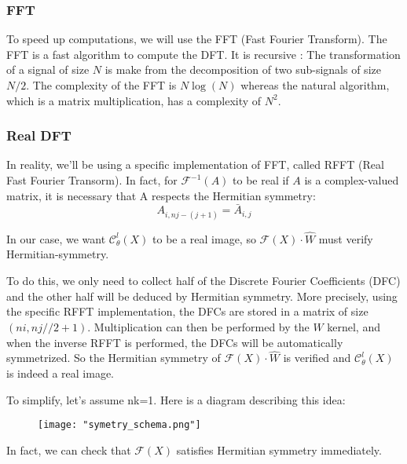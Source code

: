 \subsubsection{FFT}

To speed up computations, we will use the FFT (Fast Fourier Transform). The FFT is a fast algorithm to compute the DFT. It is recursive : The transformation of a signal of size $N$ is make from the decomposition of two sub-signals of size $N/2$. The complexity of the FFT is $N\log(N)$ whereas the natural algorithm, which is a matrix multiplication, has a complexity of $N^2$.

\subsubsection{Real DFT}

In reality, we'll be using a specific implementation of FFT, called RFFT (Real Fast Fourier Transorm). In fact, for $\mathcal{F}^{-1}(A)$ to be real if $A$ is a complex-valued matrix, it is necessary that A respects the Hermitian symmetry:
\begin{equation*}
	A_{i,nj-(j+1)} = \bar{A}_{i,j}
\end{equation*}

In our case, we want $\mathcal{C}_\theta^l(X)$ to be a real image, so $\mathcal{F}(X)\cdot\hat{W}$ must verify Hermitian-symmetry.

To do this, we only need to collect half of the Discrete Fourier Coefficients (DFC) and the other half will be deduced by Hermitian symmetry. More precisely, using the specific RFFT implementation, the DFCs are stored in a matrix of size $(ni,nj//2+1)$. Multiplication can then be performed by the $\hat{W}$ kernel, and when the inverse RFFT is performed, the DFCs will be automatically symmetrized. So the Hermitian symmetry of $\mathcal{F}(X)\cdot\hat{W}$ is verified and $\mathcal{C}_\theta^l(X)$ is indeed a real image.

To simplify, let's assume nk=1. Here is a diagram describing this idea:

\begin{figure}[H]
	\centering
	\texttt{[image: "symetry\_schema.png"]}
\end{figure}

\begin{Rem}
	In fact, we can check that $\mathcal{F}(X)$ satisfies Hermitian symmetry immediately.
\end{Rem}

